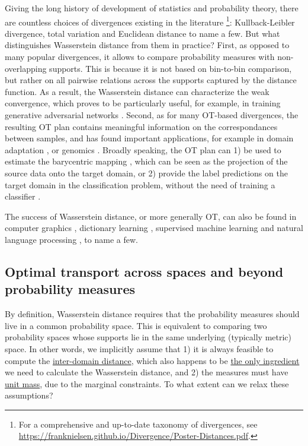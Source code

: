 Giving the long history of development of statistics and probability theory,
there are countless choices of divergences existing in the literature
\footnote{For a comprehensive and up-to-date taxonomy of divergences, see
\url{https://franknielsen.github.io/Divergence/Poster-Distances.pdf}.}:
Kullback-Leibler divergence, total variation and Euclidean distance to name a few.
But what distinguishes Wasserstein distance from them in practice?
First, as opposed to many popular divergences, it allows to compare probability measures with
non-overlapping supports. This is because it is not based on bin-to-bin comparison,
but rather on all pairwise relations across the supports captured by the distance function.
As a result, the Wasserstein distance can characterize the weak convergence,
which proves to be particularly useful, for example, in training generative adversarial networks \citep{Arjovsky17}.
Second, as for many OT-based divergences, the resulting OT plan contains
meaningful information on the correspondances between samples, and has found important applications,
for example in domain adaptation \citep{Courty16}, or genomics \citep{Schiebinger19}.
Broadly speaking, the OT plan can 1) be used to estimate the barycentric mapping
\citep{Ferradans14,Courty16}, which can be seen as the projection of the source data
onto the target domain, or 2) provide the label predictions on the target domain
in the classification problem, without the need of training a classifier \citep{Redko19a}.

The success of Wasserstein distance, or more generally OT, can also be found in
computer graphics \citep{Bonneel16,Solomon15,Bonneel23}, dictionary learning \citep{Rolet16},
supervised machine learning \citep{Frogner15} and
natural language processing \citep{Kusner15}, to name a few.

\subsection{Optimal transport across spaces and beyond probability measures}

By definition, Wasserstein distance requires that the probability measures
should live in a common probability space. This is equivalent to comparing two
probability spaces whose supports lie in the same underlying (typically metric) space.
In other words, we implicitly assume that 1) it is always feasible to compute
the \underline{inter-domain distance}, which also happens to be \underline{the only ingredient}
we need to calculate the Wasserstein distance, and 2) the measures must have \underline{unit mass},
due to the marginal constraints. To what extent can we relax these assumptions?

